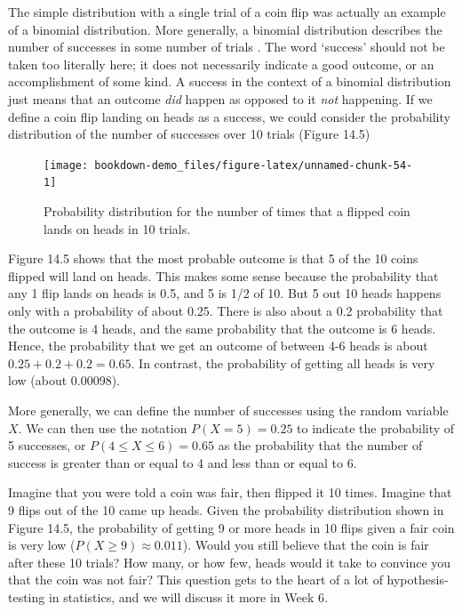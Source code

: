 \documentclass[
]{scrbook}
\begin{document}
The simple distribution with a single trial of a coin flip was actually an example of a binomial distribution.
More generally, a binomial distribution describes the number of successes in some number of trials \citep{Miller2004}.
The word `success' should not be taken too literally here; it does not necessarily indicate a good outcome, or an accomplishment of some kind.
A success in the context of a binomial distribution just means that an outcome \emph{did} happen as opposed to it \emph{not} happening.
If we define a coin flip landing on heads as a success, we could consider the probability distribution of the number of successes over 10 trials (Figure 14.5)

\begin{figure}
\texttt{[image: bookdown-demo\_files/figure-latex/unnamed-chunk-54-1]} \caption{Probability distribution for the number of times that a flipped coin lands on heads in 10 trials.}\label{fig:unnamed-chunk-54}
\end{figure}

Figure 14.5 shows that the most probable outcome is that 5 of the 10 coins flipped will land on heads.
This makes some sense because the probability that any 1 flip lands on heads is 0.5, and 5 is 1/2 of 10.
But 5 out 10 heads happens only with a probability of about 0.25.
There is also about a 0.2 probability that the outcome is 4 heads, and the same probability that the outcome is 6 heads.
Hence, the probability that we get an outcome of between 4-6 heads is about \(0.25 + 0.2 + 0.2 = 0.65\).
In contrast, the probability of getting all heads is very low (about 0.00098).

More generally, we can define the number of successes using the random variable \(X\).
We can then use the notation \(P(X = 5) = 0.25\) to indicate the probability of 5 successes, or \(P(4 \leq X \leq 6) = 0.65\) as the probability that the number of success is greater than or equal to 4 and less than or equal to 6.

Imagine that you were told a coin was fair, then flipped it 10 times.
Imagine that 9 flips out of the 10 came up heads.
Given the probability distribution shown in Figure 14.5, the probability of getting 9 or more heads in 10 flips given a fair coin is very low (\(P(X \geq 9) \approx 0.011\)).
Would you still believe that the coin is fair after these 10 trials?
How many, or how few, heads would it take to convince you that the coin was not fair?
This question gets to the heart of a lot of hypothesis-testing in statistics, and we will discuss it more in Week 6.
\end{document}
